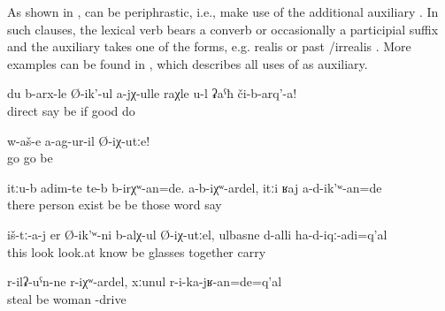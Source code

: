 As shown in ,  can be periphrastic, i.e., make use of the additional auxiliary   . In such clauses, the lexical verb bears a converb or occasionally a participial suffix and the auxiliary  takes one of the  forms, e.g. realis   or past \slash irrealis  . More examples can be found in , which describes all uses of  as auxiliary.
%
\begin{exe}
	\ex	\label{ex:‎If I do not tell it correctly, correct me!}
	\gll	du	b-arx-le	Ø-ik'-ul	a-jχ-ulle	raχle	u-l	ʡaˁħ	či-b-arq'-a!	\\
			direct	say	be	if		good	do	\\
	\glt	{}

	\ex	\label{ex:Let's go if you did not go there!}
	\gll	w-aš-e	a-ag-ur-il	Ø-iχ-utːe!\\
		go	go	be\\
	\glt	{}

	\ex	\label{ex:There must have been people there}
	\gll	itːu-b	adim-te	te-b	b-irχʷ-an=de.	a-b-iχʷ-ardel,	itːi	ʁaj	a-d-ik'ʷ-an=de\\
		there	person	exist	be		be	those	word	say\\
	\glt	{}

	\ex	\label{ex:‎If I (masc.) had known that I will look at them, I had brought my glasses}
	\gll	iš-tː-a-j	er	Ø-ik'ʷ-ni	b-alχ-ul	Ø-iχ-utːel,	ulbasne d-alli	ha-d-iqː-adi=q'al\\
		this	look	look.at	know	be	glasses	together	carry\\
	\glt	{}

	\ex	\label{ex:If the woman had stolen, they would/should have imprisoned her}
	\gll	r-ilʡ-uˁn-ne	r-iχʷ-ardel,	xːunul	r-i-ka-jʁ-an=de=q'al\\
		steal	be	woman	 -drive\\
	\glt	{}
\end{exe}


